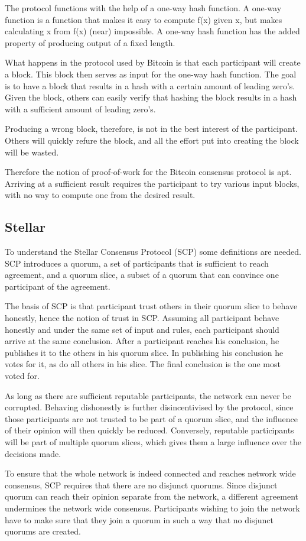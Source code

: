 \documentclass[12pt]{report}
\theoremstyle{plain}
\theoremstyle{definition}
\begin{document}
	The protocol functions with the help of a one-way hash function. A one-way function is a function that makes it easy to compute f(x) given x, but makes calculating x from f(x) (near) impossible. A one-way hash function has the added property of producing output of a fixed length.
	
	What happens in the protocol used by Bitcoin is that each participant will create a block. This block then serves as input for the one-way hash function. The goal is to have a block that results in a hash with a certain amount of leading zero's. Given the block, others can easily verify that hashing the block results in a hash with a sufficient amount of leading zero's.
	
	Producing a wrong block, therefore, is not in the best interest of the participant. Others will quickly refure the block, and all the effort put into creating the block will be wasted.
	
	Therefore the notion of proof-of-work for the Bitcoin consensus protocol is apt. Arriving at a sufficient result requires the participant to try various input blocks, with no way to compute one from the desired result.
	
	\subsection{Stellar}
	To understand the Stellar Consensus Protocol\cite{stellarconsensus} (SCP) some definitions are needed. SCP introduces a quorum, a set of participants that is sufficient to reach agreement, and a quorum slice, a subset of a quorum that can convince one participant of the agreement.
	
	The basis of SCP is that participant trust others in their quorum slice to behave honestly, hence the notion of trust in SCP. Assuming all participant behave honestly and under the same set of input and rules, each participant should arrive at the same conclusion. After a participant reaches his conclusion, he publishes it to the others in his quorum slice. In publishing his conclusion he votes for it, as do all others in his slice. The final conclusion is the one most voted for.
	
	As long as there are sufficient reputable participants, the network can never be corrupted. Behaving dishonestly is further disincentivised by the protocol, since those participants are not trusted to be part of a quorum slice, and the influence of their opinion will then quickly be reduced. Conversely, reputable participants will be part of multiple quorum slices, which gives them a large influence over the decisions made.
	
	To ensure that the whole network is indeed connected and reaches network wide consensus, SCP requires that there are no disjunct quorums. Since disjunct quorum can reach their opinion separate from the network, a different agreement undermines the network wide consensus. Participants wishing to join the network have to make sure that they join a quorum in such a way that no disjunct quorums are created.
\end{document}
